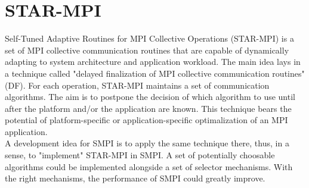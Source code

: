 \section{STAR-MPI}
Self-Tuned Adaptive Routines for MPI Collective Operations (STAR-MPI)
is a set of MPI collective communication routines that are capable of
dynamically adapting to system architecture and application
workload. The main idea lays in a technique called "delayed
finalization of MPI collective communication routines" (DF). For each
operation, STAR-MPI maintains a set of communication algorithms. The
aim is to postpone the decision of which algorithm to use until after
the platform and/or the application are known. This technique bears
the potential of platform-specific or application-specific
optimalization of an MPI application.\cite{fyl06}\\
A development idea for SMPI is to apply the same technique there,
thus, in a sense, to "implement" STAR-MPI in SMPI. A set of
potentially choosable algorithms could be implemented alongside a set
of selector mechanisms. With the right mechanisms, the performance of
SMPI could greatly improve.
